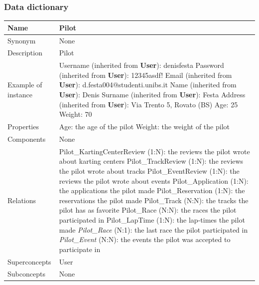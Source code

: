 \documentclass{beamer}
\begin{document}
\begin{frame}
    \frametitle{Data dictionary}
    \begin{table}
    \tiny
    \begin{tabular}{|p{2cm}|p{6cm}|}
    \hline
    Name & \textbf{Pilot} \\
    \hline
    Synonym & None \\
    \hline
    Description & Pilot \\
    \hline
    Example of instance &
    Username (inherited from \textbf{User}): denisfesta \newline
    Password (inherited from \textbf{User}): 12345asdf!  \newline
    Email (inherited from \textbf{User}): d.festa004@studenti.unibs.it \newline
    Name (inherited from \textbf{User}): Denis \newline
    Surname (inherited from \textbf{User}): Festa \newline
    Address (inherited from \textbf{User}): Via Trento 5, Rovato (BS) \newline
    Age: 25 \newline
    Weight: 70 \\
    \hline
    Properties &
    Age: the age of the pilot \newline
    Weight: the weight of the pilot \\
    \hline
    Components & None \\
    \hline
    Relations &
    Pilot\_KartingCenterReview (1:N): the reviews the pilot wrote about karting centers \newline
    Pilot\_TrackReview (1:N): the reviews the pilot wrote about tracks \newline
    Pilot\_EventReview (1:N): the reviews the pilot wrote about events \newline
    Pilot\_Application (1:N): the applications the pilot made \newline
    Pilot\_Reservation (1:N): the reservations the pilot made \newline
    Pilot\_Track (N:N): the tracks the pilot has as favorite \newline
    Pilot\_Race (N:N): the races the pilot participated in \newline
    Pilot\_LapTime (1:N): the lap-times the pilot made \newline
    \textit{Pilot\_Race} (N:1): the last race the pilot participated in \newline
    \textit{Pilot\_Event} (N:N): the events the pilot was accepted to participate in \\
    \hline
    Superconcepts & User \\
    \hline
    Subconcepts & None \\
    \hline
    \end{tabular}
    \end{table}
\end{frame}
\end{document}
